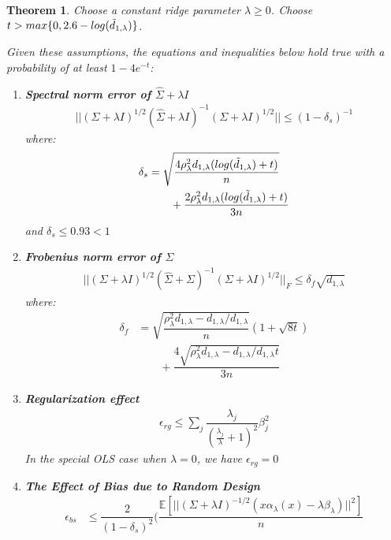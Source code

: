 \documentclass[nohyperref]{article}
\theoremstyle{plain}
\newtheorem{theorem}{Theorem}[section]
\theoremstyle{definition}
\theoremstyle{remark}
\begin{document}
\begin{theorem}
\label{thm:ridge}
Choose a constant ridge parameter $\lambda \geq 0$. Choose $t > max\{0, 2.6 - log(\Tilde{d}_{1,\lambda})\}$.

Given these assumptions, the equations and inequalities below hold true with a probability of at least $1 - 4e^{-t}$:
\begin{enumerate}
    \item \textbf{Spectral norm error of $\hat{\Sigma} + \lambda I$}
    \begin{align*}
        ||(\Sigma + \lambda I)^{1/2}(\hat{\Sigma} + \lambda I)^{-1}(\Sigma + \lambda I)^{1/2}|| \leq (1 - \delta_s)^{-1}
    \end{align*}
    where:
    \begin{align*}
        \delta_s &= \sqrt{\dfrac{4 \rho^2_{\lambda} d_{1, \lambda} (log(\Tilde{d}_{1, \lambda}) + t)}{n}} \\
        &\qquad + \dfrac{2 \rho^2_{\lambda} d_{1, \lambda} (log(\Tilde{d}_{1, \lambda}) + t)}{3n}
    \end{align*}
    and $\delta_s \leq 0.93 < 1$
    \item \textbf{Frobenius norm error of $\hat{\Sigma}$}
    \begin{align*}
        ||(\Sigma + \lambda I)^{1/2}(\hat{\Sigma} + \Sigma)^{-1}(\Sigma + \lambda I)^{1/2}||_F \leq \delta_f \sqrt{d_{1, \lambda}} 
    \end{align*}
    where:
    \begin{align*}
        \delta_f &= \sqrt{\dfrac{\rho^2_{\lambda} d_{1, \lambda} - d_{1, \lambda}/d_{1, \lambda}}{n}}(1 + \sqrt{8t}) \\
        &\qquad + \dfrac{4 \sqrt{\rho^2_{\lambda} d_{1, \lambda} - d_{1, \lambda}/d_{1, \lambda} t}}{3n}
    \end{align*}
    \item \textbf{Regularization effect}
    \begin{align*}
        \epsilon_{rg} \leq \sum_j \dfrac{\lambda_j}{(\frac{\lambda_j}{\lambda} + 1)^2}\beta_j^2
    \end{align*}
    In the special OLS case when $\lambda = 0$, we have $\epsilon_{rg} = 0$
    \item \textbf{The Effect of Bias due to Random Design}
    \begin{align*}
        \epsilon_{bs} &\leq \dfrac{2}{(1 - \delta_s)^2} \bigg(\dfrac{\mathbb{E}[||(\Sigma+\lambda I)^{-1/2} (x \alpha_{\lambda}(x) - \lambda \beta_{\lambda})||^2]}{n} \\

\end{align*}
\end{enumerate}
\end{theorem}
\end{document}
